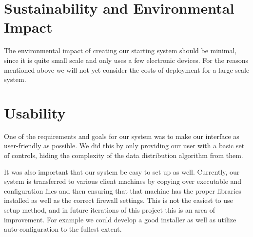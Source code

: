 \section{Sustainability and Environmental Impact}
	The environmental impact of creating our starting system should be minimal, since it is quite small scale and only uses a few electronic devices.  For the reasons mentioned above we will not yet consider the costs of deployment for a large scale system.

\section{Usability}
	One of the requirements and goals for our system was to make our interface as user-friendly as possible.  We did this by only providing our user with a basic set of controls, hiding the complexity of the data distribution algorithm from them.

	It was also important that our system be easy to set up as well.  Currently, our system is transferred to various client machines by copying over executable and configuration files and then ensuring that that machine has the proper libraries installed as well as the correct firewall settings.  This is not the easiest to use setup method, and in future iterations of this project this is an area of improvement.  For example we could develop a good installer as well as utilize auto-configuration to the fullest extent.